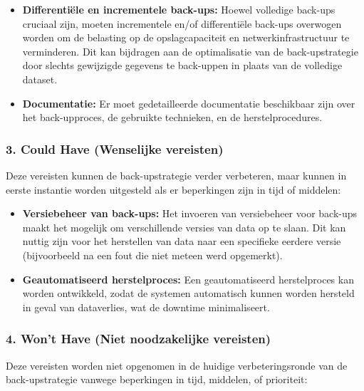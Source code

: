 \begin{itemize}
    \item \textbf{Differentiële en incrementele back-ups:} Hoewel volledige back-ups cruciaal zijn, moeten incrementele en/of differentiële back-ups overwogen worden om de belasting op de opslagcapaciteit en netwerkinfrastructuur te verminderen. Dit kan bijdragen aan de optimalisatie van de back-upstrategie door slechts gewijzigde gegevens te back-uppen in plaats van de volledige dataset.
    
    \item \textbf{Documentatie:} Er moet gedetailleerde documentatie beschikbaar zijn over het back-upproces, de gebruikte technieken, en de herstelprocedures.
    
\end{itemize}

\subsubsection{3. Could Have (Wenselijke vereisten)}
Deze vereisten kunnen de back-upstrategie verder verbeteren, maar kunnen in eerste instantie worden uitgesteld als er beperkingen zijn in tijd of middelen:

\begin{itemize}
   
    \item \textbf{Versiebeheer van back-ups:} Het invoeren van versiebeheer voor back-ups maakt het mogelijk om verschillende versies van data op te slaan. Dit kan nuttig zijn voor het herstellen van data naar een specifieke eerdere versie (bijvoorbeeld na een fout die niet meteen werd opgemerkt).
    
    \item \textbf{Geautomatiseerd herstelproces:} Een geautomatiseerd herstelproces kan worden ontwikkeld, zodat de systemen automatisch kunnen worden hersteld in geval van dataverlies, wat de downtime minimaliseert.
\end{itemize}

\subsubsection{4. Won't Have (Niet noodzakelijke vereisten)}
Deze vereisten worden niet opgenomen in de huidige verbeteringsronde van de back-upstrategie vanwege beperkingen in tijd, middelen, of prioriteit:

